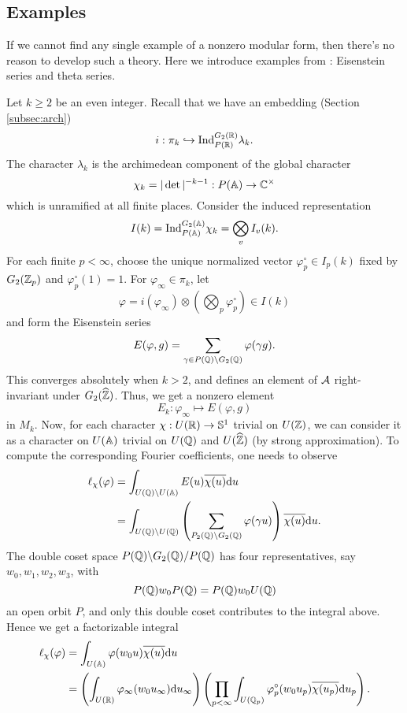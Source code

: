\subsection{Examples}
\label{subsec:g2modex}

If we cannot find any single example of a nonzero modular form, then there's no reason to develop such a theory.
Here we introduce examples from \cite{gan2002fourier}: Eisenstein series and theta series.

Let $k \ge 2$ be an even integer.
Recall that we have an embedding (Section \ref{subsec:arch})
$$
i: \pi_{k} \hookrightarrow \mathrm{Ind}_{P(\mathbb{R})}^{G_2(\mathbb{R})} \lambda_{k}.
$$
The character $\lambda_k$ is the archimedean component of the global character
$$
\chi_k = |\det|^{-k-1} : P(\mathbb{A}) \to \mathbb{C}^\times
$$
which is unramified at all finite places.
Consider the induced representation
$$
I(k) = \mathrm{Ind}_{P(\mathbb{A})}^{G_2(\mathbb{A})} \chi_k = \bigotimes_v I_v(k).
$$
For each finite $p < \infty$, choose the unique normalized vector $\varphi_p^\circ \in I_p(k)$ fixed by $G_2(\mathbb{Z}_p)$ and $\varphi_p^\circ(1) = 1$.
For $\varphi_\infty \in \pi_k$, let
$$
\varphi = i(\varphi_\infty) \otimes \left(\bigotimes_{p} \varphi_p^\circ\right) \in I(k)
$$
and form the Eisenstein series
$$
E({\varphi}, g) = \sum_{\gamma \in P(\mathbb{Q}) \backslash G_2(\mathbb{Q})} {\varphi}(\gamma g).
$$
This converges absolutely when $k > 2$, and defines an element of $\mathcal{A}$ right-invariant under $G_2(\widehat{\mathbb{Z}})$.
Thus, we get a nonzero element
$$
E_k: \varphi_\infty \mapsto E(\varphi, g)
$$
in $M_k$.
Now, for each character $\chi : U(\mathbb{R}) \to \mathbb{S}^1$ trivial on $U(\mathbb{Z})$, we can consider it as a character on $U(\mathbb{A})$ trivial on $U(\mathbb{Q})$ and $U(\widehat{\mathbb{Z}})$ (by strong approximation).
To compute the corresponding Fourier coefficients, one needs to observe
\begin{align*}
\ell_\chi(\varphi) &= \int_{U(\mathbb{Q}) \backslash U(\mathbb{A})} E(u) \overline{\chi(u)} \mathrm{d} u \\
&= \int_{U(\mathbb{Q}) \backslash U(\mathbb{Q})} \left( \sum_{P_2(\mathbb{Q}) \backslash G_2(\mathbb{Q})} \varphi(\gamma u)\right) \overline{\chi(u)} \mathrm{d} u.
\end{align*}
The double coset space $P(\mathbb{Q}) \backslash G_2(\mathbb{Q}) / P(\mathbb{Q})$ has four representatives, say $w_0, w_1, w_2, w_3$, with
$$
P(\mathbb{Q}) w_0 P(\mathbb{Q}) = P(\mathbb{Q}) w_0 U(\mathbb{Q})
$$
an open orbit $P$, and only this double coset contributes to the integral above.
Hence we get a factorizable integral
\begin{align*}
\ell_\chi(\varphi) &= \int_{U(\mathbb{A})} \varphi(w_0 u) \overline{\chi(u)} \mathrm{d} u \\
&= \left(\int_{U(\mathbb{R})} \varphi_\infty(w_0 u_\infty) \mathrm{d} u_\infty\right)\left(\prod_{p < \infty} \int_{U(\mathbb{Q}_p)} \varphi_p^\circ(w_0 u_p) \overline{\chi(u_p)} \mathrm{d} u_p\right).
\end{align*}
